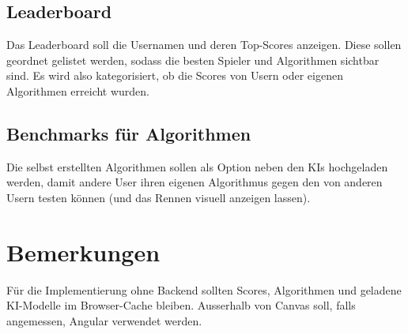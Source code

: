 \documentclass[8pt]{extarticle}
\begin{document}
\subsection{Leaderboard}
Das Leaderboard soll die Usernamen und deren Top-Scores anzeigen. Diese sollen geordnet gelistet werden, sodass die besten Spieler und Algorithmen sichtbar sind. Es wird also kategorisiert, ob die Scores von Usern oder eigenen Algorithmen erreicht wurden.

\subsection{Benchmarks für Algorithmen}
Die selbst erstellten Algorithmen sollen als Option neben den KIs hochgeladen werden, damit andere User ihren eigenen Algorithmus gegen den von anderen Usern testen können (und das Rennen visuell anzeigen lassen). 

\section*{Bemerkungen}
Für die Implementierung ohne Backend sollten Scores, Algorithmen und geladene KI-Modelle im Browser-Cache bleiben. Ausserhalb von Canvas soll, falls angemessen, Angular verwendet werden.
\end{document}
